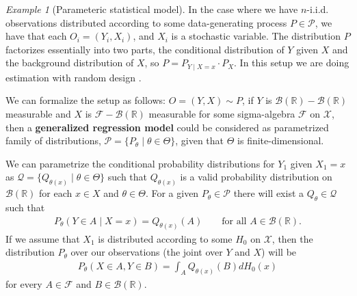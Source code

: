 \documentclass[11pt, a4paper]{article}
\theoremstyle{definition}
\theoremstyle{remark}
\newtheorem{example}{Example}
\begin{document}
\begin{example}[Parameteric statistical model] \label{ex:parametricfam}
    In the case where we have $ n $-i.i.d. observations distributed according to some data-generating process $ P \in \mathcal{P} $, we have that each $ O_i = (Y_i , X_i) $, and $ X_i $ is a stochastic variable. The distribution $ P $ factorizes essentially into two parts, the conditional distribution of $ Y $ given $ X $ and the background distribution of $ X $, so $ P = P_{Y \mid X = x} \cdot P_X $. In this setup we are doing estimation with random design \cite{gyorfi2002distribution}.  

We can formalize the setup as follows: $ O = (Y, X) \sim P $, if $ Y $ is $ \mathcal{B}(\mathbb{R})-\mathcal{B}(\mathbb{R}) $ measurable and $ X $ is $ \mathcal{F} - \mathcal{B}(\mathbb{R})  $ measurable for some sigma-algebra $ \mathcal{F} $ on $ \mathcal{X} $, then a \textbf{generalized regression model} could be considered as parametrized family of distributions, $ \mathcal{P} = \{P_{\theta} \mid \theta \in \Theta\} $, given that $ \Theta $ is finite-dimensional.

    We can parametrize the conditional probability distributions for $ Y_1 $ given $ X_1 = x $ as $ \mathcal{Q} = \{Q_{\theta(x)} \mid \theta \in \Theta \} $ such that $ Q_{\theta(x)} $ is a valid probability distribution on $ \mathcal{B}(\mathbb{R}) $ for each $ x \in X $ and $ \theta \in \Theta $. For a given $ P_{\theta} \in \mathcal{P} $ there will exist a $ Q_{\theta} \in \mathcal{Q} $ such that  
    \begin{align*}
        P_{\theta}(Y \in A \mid X = x) = Q_{ \theta(x)}(A) \qquad \text{for all } A \in \mathcal{B}(\mathbb{R}).
    \end{align*}
    If we assume that $ X_1 $ is distributed according to some $ H_0 $ on $ \mathcal{X} $, then the distribution $ P_{\theta} $ over our observations (the joint over $ Y $ and $ X $) will be
    \begin{align*}
        P_{\theta }(X \in A, Y \in B ) = \int_{A} Q_{\theta(x)}(B) d H_{0}(x) 
    \end{align*}
    for every $ A \in \mathcal{F} $ and $ B \in \mathcal{B}(\mathbb{R}) $. 
\end{example}
\end{document}
